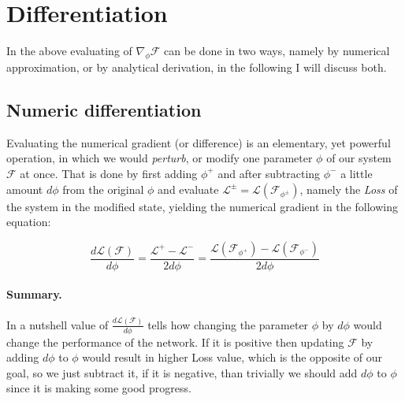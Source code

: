 \section{Differentiation}\label{sec:diff}
In the above evaluating of $\nabla_\phi \mathcal{F}$ can be done in two ways, namely by numerical approximation, or by analytical derivation, in the following I will discuss both.

\subsection{Numeric differentiation} Evaluating the numerical gradient (or difference) is an elementary, yet powerful operation, in which we would \emph{perturb}, or modify one parameter $\phi$ of our system $\mathcal{F}$ at once.
That is done by first adding $\phi^+$ and after subtracting $\phi^-$ a little amount $d\phi$ from the original $\phi$ and evaluate $\mathcal{L}^{\pm}=\mathcal{L}(\mathcal{F}_{\phi^{\pm}})$, namely the \emph{Loss} of the system in the modified state, yielding the numerical gradient in the following equation:

\begin{equation} \label{eq:numgrad}
    \frac{d\mathcal{L}(\mathcal{F})}{d\phi} = 
    \frac{\mathcal{L}^+ - \mathcal{L}^-}{2 d\phi} = 
    \frac{\mathcal{L}(\mathcal{F}_{\phi^+}) - \mathcal{L}(\mathcal{F}_{\phi^-})}{2 d\phi}
\end{equation}

\paragraph{Summary.} In a nutshell value of $\frac{d\mathcal{L}(\mathcal{F})}{d\phi}$ tells how changing the parameter $\phi$ by $d\phi$ would change the performance of the network. If it is positive then updating $\mathcal{F}$ by adding $d\phi$ to $\phi$ would result in higher Loss value, which is the opposite of our goal, so we just subtract it, if it is negative, than trivially we should add $d\phi$ to $\phi$ since it is making some good progress.

